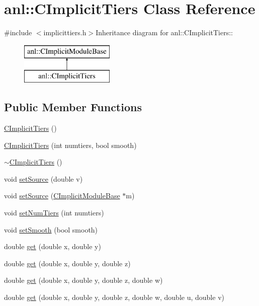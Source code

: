 \hypertarget{classanl_1_1CImplicitTiers}{
\section{anl::CImplicitTiers Class Reference}
\label{classanl_1_1CImplicitTiers}
}


{\ttfamily \#include $<$implicittiers.h$>$}Inheritance diagram for anl::CImplicitTiers::\begin{figure}[H]
\begin{center}
\leavevmode
\includegraphics[height=2cm]{classanl_1_1CImplicitTiers}
\end{center}
\end{figure}
\subsection*{Public Member Functions}
\begin{DoxyCompactItemize}
\item 
\hyperlink{classanl_1_1CImplicitTiers_aa05c90fd55c9ba232439e00498215236}{CImplicitTiers} ()
\item 
\hyperlink{classanl_1_1CImplicitTiers_a4ad35a52b15bf013589efb0d82cfe096}{CImplicitTiers} (int numtiers, bool smooth)
\item 
\hyperlink{classanl_1_1CImplicitTiers_a59ef4a8b26baff0614ef8872673e7a55}{$\sim$CImplicitTiers} ()
\item 
void \hyperlink{classanl_1_1CImplicitTiers_af22ec08e2314b38ab6d7f539ffde8728}{setSource} (double v)
\item 
void \hyperlink{classanl_1_1CImplicitTiers_aab6ab1f4ba22c000701c8aa3c8c60fa3}{setSource} (\hyperlink{classanl_1_1CImplicitModuleBase}{CImplicitModuleBase} $\ast$m)
\item 
void \hyperlink{classanl_1_1CImplicitTiers_a9e279587e75fad5db248fca3cb8ce0a1}{setNumTiers} (int numtiers)
\item 
void \hyperlink{classanl_1_1CImplicitTiers_a8d90e5c2032ceb397c3186f6e4f836f0}{setSmooth} (bool smooth)
\item 
double \hyperlink{classanl_1_1CImplicitTiers_a497494a60352ce9490ddd28125beb01a}{get} (double x, double y)
\item 
double \hyperlink{classanl_1_1CImplicitTiers_a6b1cc8151e56b6c9c66da13be3f73a80}{get} (double x, double y, double z)
\item 
double \hyperlink{classanl_1_1CImplicitTiers_a7bb007d1a541d37b5d48027a932f4117}{get} (double x, double y, double z, double w)
\item 
double \hyperlink{classanl_1_1CImplicitTiers_a0b150115944a998eac7c87ea937c1f89}{get} (double x, double y, double z, double w, double u, double v)
\end{DoxyCompactItemize}
